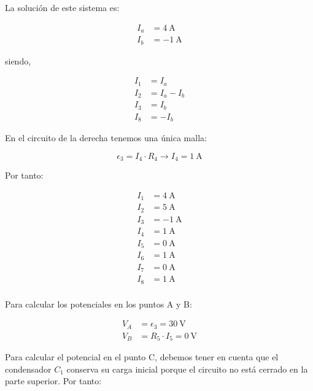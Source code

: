 \vspace{2mm}
La solución de este sistema es:

\vspace{-4mm}
\begin{align*}
  I_a &= \qty{4}{\ampere}\\
  I_b &= \qty{-1}{\ampere}
\end{align*}

\vspace{-4mm}
siendo,

\vspace{-4mm}
\begin{align*}
  I_1 &= I_a\\
  I_2 &= I_a - I_b\\
  I_3 &= I_b\\
  I_8 &= -I_b
\end{align*}

En el circuito de la derecha tenemos una única malla:

\begin{equation*}
  \epsilon_3 = I_4 \cdot R_4 \rightarrow I_4 = \qty{1}{\ampere}
\end{equation*}

Por tanto:

\begin{align*}
  I_1 &= \qty{4}{\ampere}\\
  I_2 &= \qty{5}{\ampere}\\
  I_3 &= \qty{-1}{\ampere}\\
  I_4 &= \qty{1}{\ampere}\\
  I_5 &= \qty{0}{\ampere}\\
  I_6 &= \qty{1}{\ampere}\\
  I_7 &= \qty{0}{\ampere}\\
  I_8 &= \qty{1}{\ampere}\\
\end{align*}

Para calcular los potenciales en los puntos A y B:

\vspace{-3mm}
\begin{align*}
  V_A &= \epsilon_3 = \qty{30}{\volt}\\
  V_B &= R_5 \cdot I_5 = \qty{0}{\volt}
\end{align*}

Para calcular el potencial en el punto C, debemos tener en cuenta que el condensador $C_1$ conserva su carga inicial porque el circuito no está cerrado en la parte superior. Por tanto:

